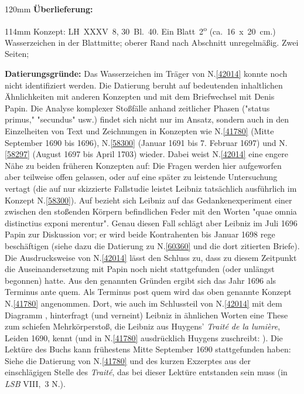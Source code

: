 
\begin{ledgroupsized}[r]{120mm}
\footnotesize
\pstart
\noindent\textbf{Überlieferung:}
\pend
\end{ledgroupsized}
\begin{ledgroupsized}[r]{114mm}
\footnotesize
\pstart
\parindent -6mm
%
Konzept:
LH~XXXV~8, 30~Bl.~40.
Ein Blatt~2\textsuperscript{o}
(ca.~16~x~20~cm.)
{Wasserzeichen} in der Blattmitte;
oberer Rand nach Abschnitt unregelmäßig.
Zwei Seiten;
\pend
\end{ledgroupsized}
\vspace{5mm}
\begin{ledgroup}
\footnotesize
\pstart
\noindent
\textbf{Datierungsgründe:}
Das Wasserzeichen im Träger von N.\;\ref{42014}
konnte noch nicht identifiziert werden.
Die Datierung beruht auf bedeutenden inhaltlichen Ähnlichkeiten mit anderen Konzepten und mit dem Briefwechsel mit Denis Papin.
\pend
\pstart
Die Analyse komplexer Stoßfälle anhand zeitlicher Phasen ("status primus," "secundus" usw.) findet sich nicht nur im Ansatz, sondern auch in den Einzelheiten von Text und Zeichnungen in Konzepten wie N.\;\ref{41780} (Mitte September 1690 bis 1696), N.\;\ref{58300} (Januar 1691 bis 7. Februar 1697) und  N.\;\ref{58297} (August 1697 bis April 1703) wieder.
Dabei weist N.\;\ref{42014} eine engere Nähe zu beiden früheren Konzepten auf: Die Fragen werden hier aufgeworfen aber teilweise offen gelassen, oder auf eine später zu leistende Untersuchung vertagt (die auf 
nur skizzierte Fallstudie leistet Leibniz tatsächlich ausführlich im Konzept N.\;\ref{58300}).
Auf  bezieht sich Leibniz auf das Gedankenexperiment einer zwischen den stoßenden Körpern befindlichen Feder mit den Worten "quae omnia distinctius exponi merentur".
Genau diesen Fall schlägt aber Leibniz im Juli 1696 Papin zur Diskussion vor; er wird beide Kontrahenten bis Januar 1698 rege beschäftigen (siehe dazu die Datierung zu N.\;\ref{60360} und die dort zitierten Briefe).
Die Ausdrucksweise von N.\;\ref{42014} lässt den Schluss zu, dass zu diesem Zeitpunkt die Auseinandersetzung mit Papin noch nicht stattgefunden (oder unlängst begonnen) hatte.
Aus den genannten Gründen ergibt sich das Jahr 1696 als Terminus ante quem.
\pend
\pstart
Als Terminus post quem wird das oben genannte Konzept N.\;\ref{41780} angenommen. Dort, wie auch im Schlussteil von N.\;\ref{42014} mit dem Diagramm , hinterfragt (und verneint) Leibniz in ähnlichen Worten eine These zum schiefen Mehrkörperstoß, die Leibniz aus Huygens' 
\cite{00525}\textit{Traité de la lumière}, Leiden 1690, kennt (und in N.\;\ref{41780} ausdrücklich Huygens zuschreibt: ).
Die Lektüre des Buchs kann frühestens Mitte September 1690 stattgefunden haben: Siehe die Datierung von N.\;\ref{41780} und des kurzen Exzerptes aus der einschlägigen Stelle des \textit{Traité}, das bei dieser Lektüre entstanden sein muss (in \cite{02094}\textit{LSB} VIII,~3 N.).
\pend
\end{ledgroup}
